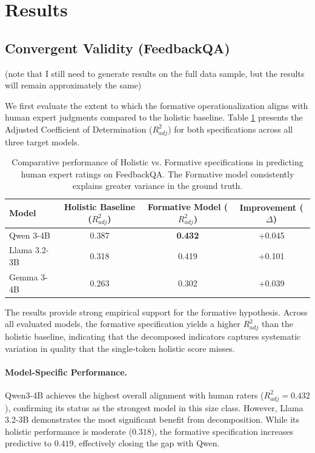 

\section{Results}

\subsection{Convergent Validity (FeedbackQA)}

(note that I still need to generate results on the full data sample, but the results will remain approximately the same)

We first evaluate the extent to which the formative operationalization aligns with human expert judgments compared to the holistic baseline. Table \ref{tab:convergent_results} presents the Adjusted Coefficient of Determination ($R^2_{adj}$) for both specifications across all three target models.

\begin{table}[h]
\centering
\caption{Comparative performance of Holistic vs. Formative specifications in predicting human expert ratings on FeedbackQA. The Formative model consistently explains greater variance in the ground truth.}\label{tab:convergent_results}
    \begin{tabular}{lccc}
        \toprule
        \textbf{Model} & \textbf{Holistic Baseline ($R^2_{adj}$)} & \textbf{Formative Model ($R^2_{adj}$)} & \textbf{Improvement ($\Delta$)} \\
        \midrule
        Qwen 3-4B    & 0.387 & \textbf{0.432} & +0.045 \\
        Llama 3.2-3B   & 0.318 & 0.419 & +0.101 \\
        Gemma 3-4B     & 0.263 & 0.302 & +0.039 \\
        \bottomrule
    \end{tabular}
\end{table}

The results provide strong empirical support for the formative hypothesis. Across all evaluated models, the formative specification yields a higher $R^2_{adj}$ than the holistic baseline, indicating that the decomposed indicators captures systematic variation in quality that the single-token holistic score misses.

\paragraph{Model-Specific Performance.}
Qwen3-4B achieves the highest overall alignment with human raters ($R^2_{adj} = 0.432$), confirming its status as the strongest model in this size class.  However, Llama 3.2-3B demonstrates the most significant benefit from decomposition. While its holistic performance is moderate ($0.318$), the formative specification increases predictive to $0.419$, effectively closing the gap with Qwen. 

